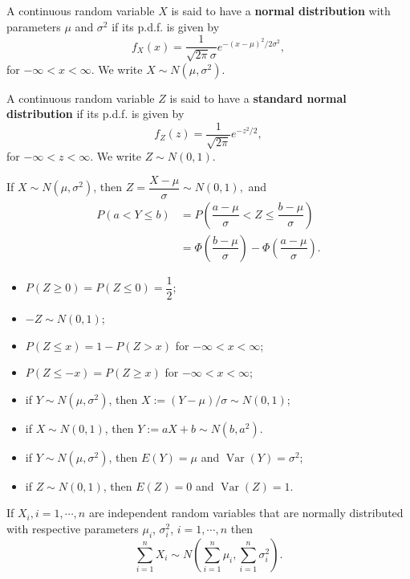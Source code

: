  A continuous random variable \(X\) is said to have a
\textbf{normal distribution} with parameters \(\mu\) and \(\sigma^2\) if its
p.d.f. is given by
\[f_X(x) = \dfrac{1}{\sqrt{2\pi}\sigma}e^{-{(x-\mu)^2}/{2\sigma^2}},\]
for \(-\infty < x < \infty\). We write \(X \sim N(\mu, \sigma^2)\).

 A continuous random variable \(Z\) is said to have a
\textbf{standard normal distribution} if its p.d.f. is given by
\[f_Z(z) = \dfrac{1}{\sqrt{2\pi}}e^{-{z^2}/{2}},\]
for \(-\infty < z < \infty\). We write \(Z \sim N(0, 1)\).

If \(X \sim N(\mu, \sigma^2)\), then
\(Z = \dfrac{X-\mu}{\sigma} \sim N(0, 1),\)
and 
\begin{align*}
P(a < Y \leq b) &= P\left(\dfrac{a-\mu}{\sigma}< Z \leq
  \dfrac{b-\mu}{\sigma}\right) \\ 
                &= \Phi\left(\dfrac{b-\mu}{\sigma}\right) - 
                \Phi\left(\dfrac{a-\mu}{\sigma}\right).
\end{align*}
\begin{itemize}
  \item \(P(Z \geq 0) = P(Z \leq 0) = \dfrac{1}{2}\);
  \item \(-Z \sim N(0, 1)\);
  \item \(P(Z \leq x) = 1 - P(Z > x)\) for \(-\infty < x < \infty\);
  \item \(P(Z \leq -x) = P(Z \geq x)\) for \(-\infty < x < \infty\);
  \item if \(Y \sim N(\mu, \sigma^2)\), then \(X := (Y-\mu)/\sigma \sim N(0,
    1)\);
  \item if \(X \sim N(0, 1)\), then \(Y := aX + b \sim N(b, a^2)\).
\end{itemize}

\begin{itemize}
  \item if \(Y \sim N(\mu, \sigma^2)\), then \(E(Y) = \mu\) and \(\operatorname{Var}(Y) =
    \sigma^2\);
  \item if \(Z\sim N(0,1)\),  then \(E(Z)=0\) and \(\operatorname{Var}(Z)=1\).
\end{itemize}

 If 
\(X_i, i = 1, \cdots, n\) are independent random variables that are normally
distributed with respective parameters \(\mu_i\), \(\sigma_i^2\), \(i = 1,
\cdots, n\) then 
\[\sum\limits_{i=1}^{n}X_i \sim N\left(\sum\limits_{i=1}^{n}\mu_i,
\sum\limits_{i=1}^{n}\sigma_i^2\right).\]

